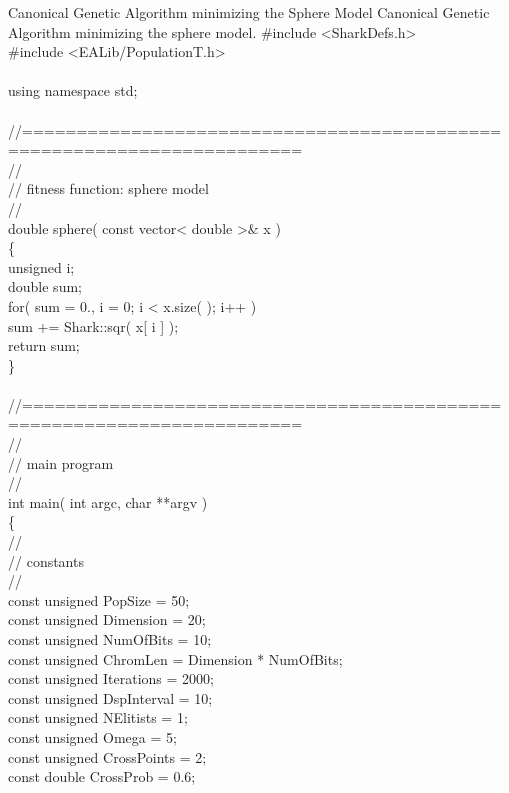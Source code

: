 \begin{programlisting}{Canonical Genetic Algorithm minimizing the Sphere Model}{
    Canonical Genetic Algorithm minimizing the sphere model.}
#include <SharkDefs.h>\\
#include <EALib/PopulationT.h>\\
\\
using namespace std;\\
\\
//=======================================================================\\
//\\
// fitness function: sphere model\\
//\\
double sphere( const vector< double >& x )\\
\{\\
    unsigned i;\\
    double   sum;\\
    for( sum = 0., i = 0; i < x.size( ); i++ )\\
        sum += Shark::sqr( x[ i ] );\\
    return sum;\\
\}\\
\\
//=======================================================================\\
//\\
// main program\\
//\\
int main( int argc, char **argv )\\
\{\\
    //\\
    // constants\\
    //\\
    const unsigned PopSize     = 50;\\
    const unsigned Dimension   = 20;\\
    const unsigned NumOfBits   = 10;\\
    const unsigned ChromLen    = Dimension * NumOfBits;\\
    const unsigned Iterations  = 2000;\\
    const unsigned DspInterval = 10;\\
    const unsigned NElitists   = 1;\\
    const unsigned Omega       = 5;\\
    const unsigned CrossPoints = 2;\\
    const double   CrossProb   = 0.6;\\

\end{programlisting}
